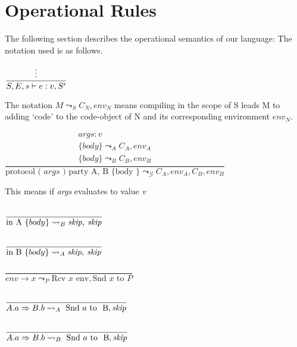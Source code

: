 
\section{Operational Rules}
The following section describes the operational semantics of our language:
The notation used is as follows.

\hspace*{10em} $\dfrac{
\vdots
}{S, E, s \vdash{}e:v,S^{\prime}}$ \bigskip

The notation $M \leadsto_S C_N, env_N$ means compiling in the scope 
of S leads M to adding `code' to the code-object of N and its corresponding 
environment $env_N$.\bigskip

\hspace*{5em} $\dfrac{
\begin{array}{l}
    args:v\\
    \{body\} \leadsto_A C_A, env_A\\
    \{body\} \leadsto_B C_B, env_B
\end{array}
}{\text{protocol ( } args \text{ )  party A, B \{ body \} } \leadsto_\mathscr{G} C_A, env_A, C_B, env_B  }$\bigskip

This means if \textit{args} evaluates to value \textit{v} 

\hspace*{10em} $\dfrac{
\begin{array}{l}
    \phantom{}
\end{array}
}{\text{in A } \{body\} \leadsto_B \text{\textit{skip, skip}}}$\bigskip

\hspace*{10em} $\dfrac{
\begin{array}{l}
    \phantom{}
\end{array}
}{\text{in B } \{body\} \leadsto_A \text{\textit{skip, skip}}}$\bigskip


\hspace*{10em} $\dfrac{
\begin{array}{l}
    \phantom{}
\end{array}
}{env \rightarrow x \leadsto_P \text{Rcv } x \text{ env}, \text{Snd } x \text{ to } P}$\bigskip

\hspace*{10em} $\dfrac{
\begin{array}{l}
    \phantom{}
\end{array}
}{A.a \Rightarrow B.b \leadsto_A \text{ Snd } a \text{ to } \text{ B}, \text{\textit{skip}}}$\bigskip

\hspace*{10em} $\dfrac{
\begin{array}{l}
    \phantom{}
\end{array}
}{A.a \Rightarrow B.b \leadsto_B \text{ Snd } a \text{ to } \text{ B}, \text{\textit{skip}}}$\bigskip
